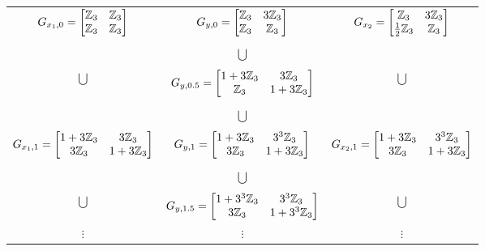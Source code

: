 \begin{table}[h]
    \footnotesize
    \begin{center}
        \begin{tabular}{ccc}
            $G_{x_1,0} = \begin{bmatrix}
                \mathbb{Z}_3 & \mathbb{Z}_3 \\ \mathbb{Z}_3 & \mathbb{Z}_3
            \end{bmatrix}$ & $G_{y,0} = \begin{bmatrix}
                \mathbb{Z}_3 & 3 \mathbb{Z}_3 \\ \mathbb{Z}_3 & \mathbb{Z}_3
            \end{bmatrix}$ & $G_{x_2} = \begin{bmatrix}
                \mathbb{Z}_3 & 3 \mathbb{Z}_3 \\ \frac{1}{2} \mathbb{Z}_3 & \mathbb{Z}_3
            \end{bmatrix}$ \\
            & & \\
            & $\bigcup$ & \\
            & & \\
            $\bigcup$ & $G_{y, 0.5} = \begin{bmatrix}
                1 + 3 \mathbb{Z}_3 & 3 \mathbb{Z}_3 \\ \mathbb{Z}_3 & 1 + 3 \mathbb{Z}_3
            \end{bmatrix}$ & $\bigcup$ \\
            & & \\
            & $\bigcup$ & \\
            & & \\
            $G_{x_1, 1} = \begin{bmatrix}
                1 + 3 \mathbb{Z}_3 & 3 \mathbb{Z}_3 \\ 3 \mathbb{Z}_3 & 1 + 3 \mathbb{Z}_3
            \end{bmatrix}$ & $G_{y, 1} = \begin{bmatrix}
                1 + 3 \mathbb{Z}_3 & 3^3 \mathbb{Z}_3 \\ 3 \mathbb{Z}_3 & 1 + 3 \mathbb{Z}_3
            \end{bmatrix}$ & $G_{x_2, 1} = \begin{bmatrix}
                1 + 3 \mathbb{Z}_3 & 3^3 \mathbb{Z}_3 \\ 3 \mathbb{Z}_3 & 1 + 3 \mathbb{Z}_3 
            \end{bmatrix}$ \\
            & & \\
            & $\bigcup$ & \\
            & & \\
            $\bigcup$ & $G_{y, 1.5} = \begin{bmatrix}
                1 + 3^3 \mathbb{Z}_3 & 3^3 \mathbb{Z}_3 \\ 3 \mathbb{Z}_3 & 1 + 3^3 \mathbb{Z}_3
            \end{bmatrix}$ & $\bigcup$ \\
            $\vdots$ & $\vdots$ & $\vdots$
        \end{tabular}
        \label{tab:uncertainty_optimal_bounds}
    \end{center}
\end{table}

